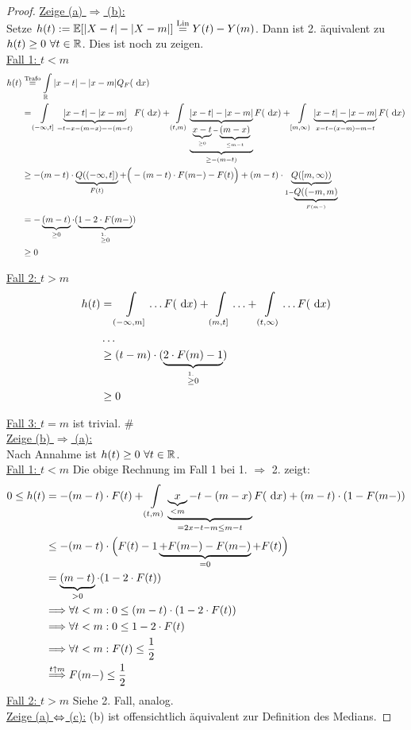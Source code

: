 \begin{proof}
\underline{Zeige (a) $\Rightarrow$ (b):}\\
Setze $h(t):=\mathbb{E}[|X-t|-|X-m|]\stackrel{\text{Lin}}{=}Y(t)-Y(m)$. Dann ist 2. äquivalent zu $h(t)\geq0~\forall t\in\mathbb{R}$. Dies ist noch zu zeigen.\\

\underline{Fall 1: $t<m$}
\begin{align*}
h(t)&\stackrel{\text{Trafo}}{=}
\int\limits_{\mathbb{R}}|x-t|-|x-m| Q_F(\text{ d} x)\\
&=\int\limits_{(-\infty,t]}\underbrace{|x-t|-|x-m|}_{=t-x-(m-x)=-(m-t)} F(\text{ d} x)
+\int\limits_{(t,m)}\underbrace{\underbrace{|x-t|-|x-m|}_{\underbrace{x-t}_{\geq0}-\underbrace{(m-x)}_{\leq m-t}}}_{\geq-(m-t)} F(\text{ d} x)
+\int\limits_{[m,\infty)}\underbrace{|x-t|-|x-m|}_{x-t-(x-m)=m-t} F(\text{ d} x)\\
&\geq-(m-t)\cdot \underbrace{Q((-\infty,t])}_{F(t)}+
\Big(-(m-t)\cdot F(m-)-F(t)\Big)
+(m-t)\cdot\underbrace{Q([m,\infty))}_{1-\underbrace{Q((-m,m)}_{F(m-)}}\\
&=-\underbrace{(m-t)}_{\geq0}\cdot(\underbrace{1-2\cdot F(m-)}_{\stackrel{1.}{\geq}0})\\
&\geq0
\end{align*}

\underline{Fall 2: $t> m$}
\begin{align*}
h(t)&=\int\limits_{(-\infty,m]}\ldots F(\text{ d} x)+\int\limits_{(m,t]}\ldots+\int\limits_{(t,\infty)}\ldots F(\text{ d} x)\\
&\ldots\\
&\geq(t-m)\cdot(\underbrace{2\cdot F(m)-1}_{\stackrel{1.}{\geq}0})\\
&\geq0
\end{align*}

\underline{Fall 3: $t=m$} ist trivial. $\#$\\

\underline{Zeige (b) $\Rightarrow$ (a):}\\
Nach Annahme ist $h(t)\geq0~\forall t\in\mathbb{R}$.\\

\underline{Fall 1: $t<m$} Die obige Rechnung im Fall 1 bei 1. $\Rightarrow$ 2. zeigt:
\begin{align*}
0\leq h(t)&=-(m-t)\cdot F(t)+\int\limits_{(t,m)}\underbrace{\underbrace{x}_{<m}-t-(m-x) }_{=2x-t-m\leq m-t}F(\text{ d} x)+(m-t)\cdot(1-F(m-))\\
&\leq-(m-t)\cdot\Big(F(t)-1\underbrace{+F(m-)-F(m-)}_{=0}+F(t)\Big)\\
&=\underbrace{(m-t)}_{>0}\cdot(1-2\cdot F(t))\\
&\Longrightarrow\forall t<m:0\leq(m-t)\cdot(1-2\cdot F(t))\\
&\Longrightarrow\forall t<m:0\leq 1-2\cdot F(t)\\
&\Longrightarrow\forall t<m:F(t)\leq\frac{1}{2}\\
&\stackrel{t\uparrow m}{\Longrightarrow}F(m-)\leq\frac{1}{2}
\end{align*}
\underline{Fall 2: $t> m$} Siehe 2. Fall, analog.\\

\underline{Zeige (a) $\Leftrightarrow$ (c):}
(b) ist offensichtlich äquivalent zur Definition des Medians.
\end{proof}

